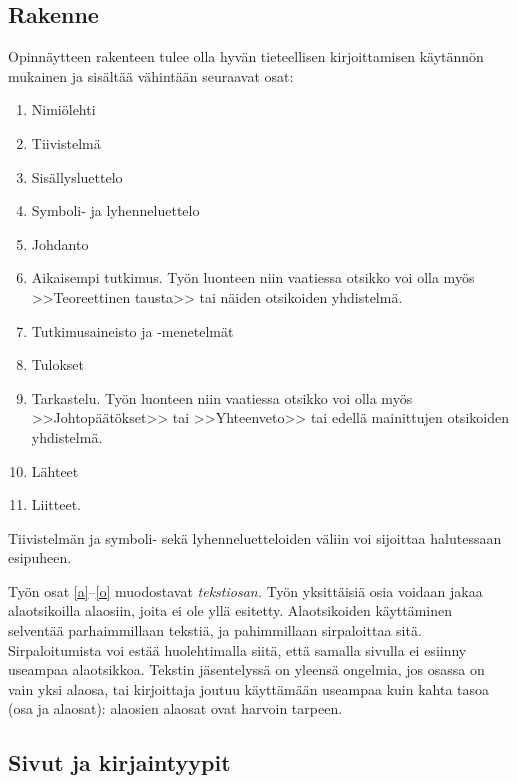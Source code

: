\documentclass[finnish, 12pt, a4paper, sci, utf8, pdfa]{aaltothesis}
\begin{document}
\subsection*{Rakenne}

Opinnäytteen rakenteen tulee olla hyvän tieteellisen kirjoittamisen käytännön
mukainen ja sisältää vähintään seuraavat osat:

\begin{enumerate}
\item Nimiölehti
\item Tiivistelmä
\item Sisällysluettelo
\item Symboli- ja lyhenneluettelo
\item \label{a} Johdanto
\item  Aikaisempi tutkimus. Työn luonteen niin vaatiessa otsikko voi olla myös
        >>Teoreettinen tausta>>  tai näiden otsikoiden yhdistelmä.
\item Tutkimusaineisto ja -menetelmät %
\item Tulokset
\item \label{o} Tarkastelu. Työn luonteen niin vaatiessa otsikko voi olla myös
		>>Johtopäätökset>> tai >>Yhteenveto>> tai edellä mainittujen otsikoiden
		yhdistelmä.
\item Lähteet
\item Liitteet.
\end{enumerate}

Tiivistelmän ja symboli- sekä lyhenneluetteloiden väliin voi sijoittaa
halutessaan esipuheen.  

Työn osat \ref{a}--\ref{o} muodostavat \textit{tekstiosan.}  Työn yksittäisiä
osia voidaan jakaa alaotsikoilla alaosiin, joita ei ole yllä esitetty. 
Alaotsikoiden käyttäminen selventää parhaimmillaan tekstiä, ja pahimmillaan 
sirpaloittaa sitä.  Sirpaloitumista voi estää huolehtimalla siitä, että samalla 
sivulla ei esiinny useampaa alaotsikkoa. Tekstin jäsentelyssä on yleensä 
ongelmia, jos osassa on vain yksi alaosa, tai kirjoittaja joutuu käyttämään 
useampaa kuin kahta tasoa (osa ja alaosat): alaosien alaosat ovat harvoin tarpeen.

\subsection*{Sivut ja kirjaintyypit}
\end{document}
